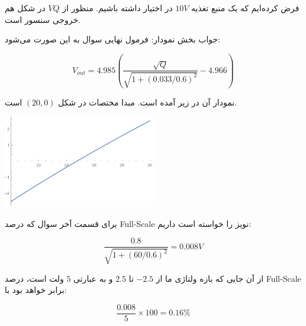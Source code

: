 \documentclass[12pt]{article}
\begin{document}
فرض کرده‌ایم که یک منبع تغذیه $10V$ در اختیار داشته باشیم. منظور از $VQ$ در شکل هم خروجی سنسور است.

جواب بخش نمودار:
فرمول نهایی سوال به این صورت می‌شود:

$$V_{out} =  4.985( \frac{\sqrt{Q}}{\sqrt{1 + (0.033/0.6)^2}} - 4.966)$$

نمودار آن در زیر آمده است. مبدا مختصات در شکل
 $(20,0)$
  است.


\begin{center}
	\includegraphics[width = 0.5\textwidth]{images/3.pdf}
\end{center}

برای قسمت آخر سوال که درصد Full-Scale نویز را خواسته است داریم:

$$\frac{0.8}{\sqrt{1 + (60/0.6)^2}} = 0.008 V$$

از آن جایی که بازه ولتاژی ما از $-2.5$ تا $2.5$ و به عبارتی $5$ ولت است، درصد Full-Scale برابر خواهد بود با:

$$\frac{0.008}{5} \times 100=0.16\%$$

 
\end{document}
